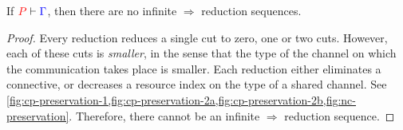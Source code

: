 \begin{theorem}[Termination]\label{thm:cp-termination}
  If $\seq[{ P }]{ \Gamma }$, then there are no infinite $\Longrightarrow$
  reduction sequences.
\end{theorem}
\begin{proof}
  Every reduction reduces a single cut to zero, one or two cuts.
  However, each of these cuts is \emph{smaller}, in the sense that the type of
  the channel on which the communication takes place is smaller.
  Each reduction either eliminates a connective, or decreases a resource index
  on the type of a shared channel.
  See \cref{fig:cp-preservation-1,fig:cp-preservation-2a,fig:cp-preservation-2b,fig:nc-preservation}.
  Therefore, there cannot be an infinite $\Longrightarrow$ reduction sequence.
\end{proof}
